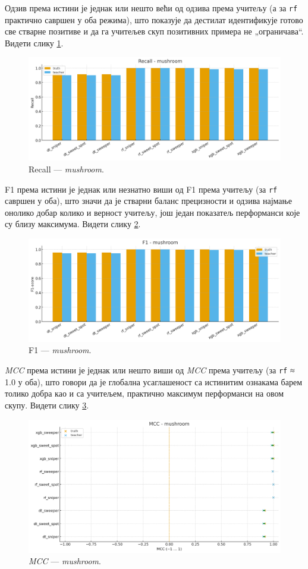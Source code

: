 Одзив према истини је једнак или нешто већи од одзива према учитељу (а за \texttt{rf} практично савршен у оба режима), што показује да дестилат идентификује готово све стварне позитиве и да га учитељев скуп позитивних примера не „ограничава“. Видети слику \ref{fig:mush-recall}.
\begin{figure}[H]
  \centering
  \includegraphics[width=.85\linewidth]{images/charts/recall_simple_mushroom.png}
  \caption{Recall — \textit{mushroom}.}
  \label{fig:mush-recall}
\end{figure}

F1 према истини је једнак или незнатно виши од F1 према учитељу (за \texttt{rf} савршен у оба), што значи да је стварни баланс прецизности и одзива најмање онолико добар колико и верност учитељу, још један показатељ перформанси које су близу максимума. Видети слику \ref{fig:mush-f1}.
\begin{figure}[H]
  \centering
  \includegraphics[width=.85\linewidth]{images/charts/f1_simple_mushroom.png}
  \caption{F1 — \textit{mushroom}.}
  \label{fig:mush-f1}
\end{figure}

\textit{MCC} према истини је једнак или нешто виши од \textit{MCC} према учитељу (за \texttt{rf} ≈ 1.0 у оба), што говори да је глобална усаглашеност са истинитим ознакама барем толико добра као и са учитељем, практично максимум перформанси на овом скупу. Видети слику \ref{fig:mush-mcc-tt}.
\begin{figure}[H]
  \centering
  \includegraphics[width=.85\linewidth]{images/charts/mcc_simple_mushroom.png}
  \caption{\textit{MCC} — \textit{mushroom}.}
  \label{fig:mush-mcc-tt}
\end{figure}

